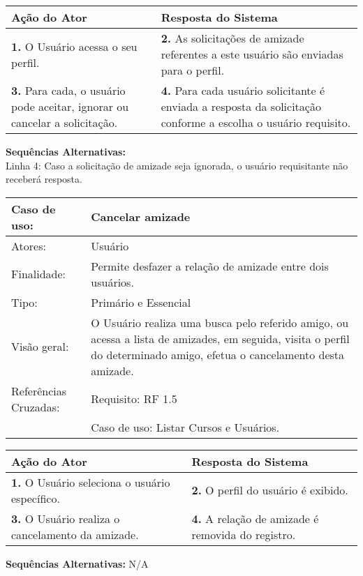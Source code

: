 \documentclass[12pt,a4paper,onecolumn,titlepage]{article}
\begin{document}
\begin{center}
\def\arraystretch{1.1}
\begin{tabular}{|p{6cm}|p{6cm}|}

\hline
\textbf{Ação do Ator} & \textbf{Resposta do Sistema} \\ \hline
\textbf{1.} O Usuário acessa o seu perfil. & \textbf{2.} As solicitações de amizade referentes a este usuário são enviadas para o perfil. \\ \hline
\textbf{3. } Para cada, o usuário pode aceitar, ignorar ou cancelar a solicitação. & \textbf{4.} Para cada usuário solicitante é enviada a resposta da solicitação conforme a escolha o usuário requisito. \\ \hline
\end{tabular}
\end{center}

\textbf{Sequências Alternativas:}\\
Linha 4: Caso a solicitação de amizade seja ignorada, o usuário requisitante não receberá resposta.

\newpage


\begin{table}[h!]
\begin{center}
\begin{tabular}{p{2.5cm} p{9.5cm}}
Caso de uso: & \textbf{Cancelar amizade} \\ \hline
Atores: & Usuário \\ \hline
Finalidade: & Permite desfazer a relação de amizade entre dois usuários. \\ \hline
Tipo: & Primário e Essencial\\ \hline
Visão geral: & O Usuário realiza uma busca pelo referido amigo, ou acessa a lista de amizades, em seguida, visita o perfil do determinado amigo, efetua o cancelamento desta amizade. \\ \hline
Referências Cruzadas: & Requisito: RF 1.5 \\ & Caso de uso: Listar Cursos e Usuários.

\end{tabular}
\end{center}
\end{table}


\begin{center}
\def\arraystretch{1.1}
\begin{tabular}{|p{6cm}|p{6cm}|}

\hline
\textbf{Ação do Ator} & \textbf{Resposta do Sistema} \\ \hline
\textbf{1.} O Usuário seleciona o usuário específico. & \textbf{2.} O perfil do usuário é exibido. \\ \hline
\textbf{3.} O Usuário realiza o cancelamento da amizade. & \textbf{4.} A relação de amizade é removida do registro.\\ \hline
\end{tabular}
\end{center}
\textbf{Sequências Alternativas:} N/A
\newpage
\end{document}
